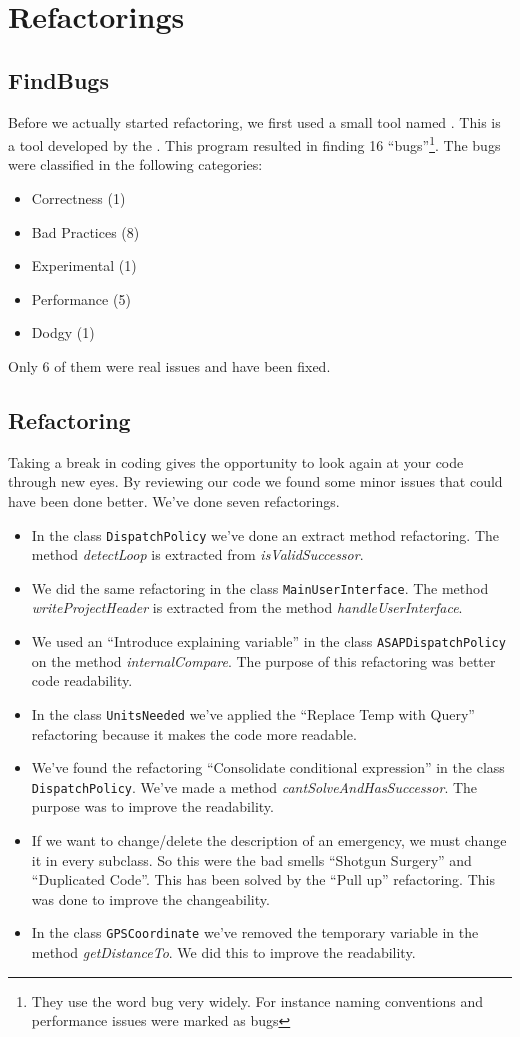 \section{Refactorings}
\subsection{FindBugs}
Before we actually started refactoring, we first used a small tool named . This is a tool developed by the . This program resulted in finding 16 ``bugs''\footnote{They use the word bug very widely. For instance naming conventions and performance issues were marked as bugs}. The bugs were classified in the following categories:
\begin{itemize}
 \item Correctness (1)
 \item Bad Practices (8)
 \item Experimental (1)
 \item Performance (5)
 \item Dodgy (1)
\end{itemize}
Only 6 of them were real issues and have been fixed.
\subsection{Refactoring}
Taking a break in coding gives the opportunity to look again at your code through new eyes. By reviewing our code we found some minor issues that could have been done better. We've done seven refactorings.
\begin{itemize}
	\item In the class \texttt{DispatchPolicy} we've done an extract method refactoring. The method \textit{detectLoop} is extracted from \textit{isValidSuccessor}.
	\item We did the same refactoring in the class \texttt{MainUserInterface}. The method \textit{writeProjectHeader} is extracted from the method \textit{handleUserInterface}.
	\item We used an ``Introduce explaining variable'' in the class \texttt{ASAPDispatchPolicy} on the method \textit{internalCompare}. The purpose of this refactoring was better code readability.
	\item In the class \texttt{UnitsNeeded} we've applied the ``Replace Temp with Query'' refactoring because it makes the code more readable.
	\item We've found the refactoring ``Consolidate conditional expression'' in the class \texttt{DispatchPolicy}. We've made a method \textit{cantSolveAndHasSuccessor}. The purpose was to improve the readability.
	\item If we want to change/delete the description of an emergency, we must change it in every subclass. So this were the bad smells ``Shotgun Surgery'' and ``Duplicated Code''. This has been solved by the ``Pull up'' refactoring. This was done to improve the changeability.
	\item In the class \texttt{GPSCoordinate} we've removed the temporary variable in the method \textit{getDistanceTo}. We did this to improve the readability.
\end{itemize}
